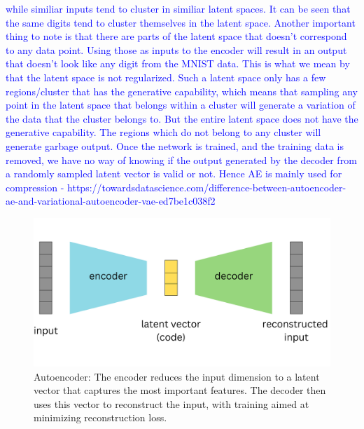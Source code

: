 \textcolor{blue}{while similiar inputs tend to cluster in similiar latent spaces.
It can be seen that the same digits tend to cluster themselves in the latent space. Another important thing to note is that there are parts of the latent space that doesn't correspond to any data point. Using those as inputs to the encoder will result in an output that doesn’t look like any digit from the MNIST data. This is what we mean by that the latent space is not regularized. Such a latent space only has a few regions/cluster that has the generative capability, which means that sampling any point in the latent space that belongs within a cluster will generate a variation of the data that the cluster belongs to. But the entire latent space does not have the generative capability. The regions which do not belong to any cluster will generate garbage output. Once the network is trained, and the training data is removed, we have no way of knowing if the output generated by the decoder from a randomly sampled latent vector is valid or not. Hence AE is mainly used for compression - https://towardsdatascience.com/difference-between-autoencoder-ae-and-variational-autoencoder-vae-ed7be1c038f2}


\begin{figure}[ht]
    \centering
      \hspace{.8cm}
      \includegraphics[width=.7\columnwidth]{figures/Autoencoder.png}
      \caption{Autoencoder: The encoder reduces the input dimension to a latent vector that captures the most important features. The decoder then uses this vector to reconstruct the input, with training aimed at minimizing reconstruction loss.}
      \label{fig:figureAE}
    \end{figure}

